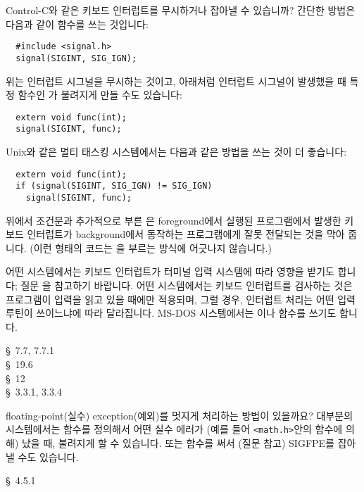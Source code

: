 \begin{faq}
	Control-C와 같은 키보드 인터럽트를 무시하거나 잡아낼 수 있습니까?
\A
	간단한 방법은 다음과 같이  함수를 쓰는 것입니다:
\begin{verbatim}
  #include <signal.h>
  signal(SIGINT, SIG_IGN);
\end{verbatim}

	위는 인터럽트 시그널을 무시하는 것이고, 아래처럼 인터럽트 시그널이
	발생했을 때 특정 함수인 가 불려지게 만들 수도 있습니다:

\begin{verbatim}
  extern void func(int);
  signal(SIGINT, func);
\end{verbatim}

	Unix와 같은 멀티 태스킹 시스템에서는 다음과 같은 방법을 쓰는 것이
	더 좋습니다:

\begin{verbatim}
  extern void func(int);
  if (signal(SIGINT, SIG_IGN) != SIG_IGN)
    signal(SIGINT, func);
\end{verbatim}

	위에서 조건문과 추가적으로 부른 은
	foreground에서 실행된 프로그램에서
	발생한 키보드 인터럽트가 background에서 동작하는 프로그램에게
	잘못 전달되는 것을 막아 줍니다.  (이런 형태의 코드는 을
	부르는 방식에 어긋나지 않습니다.)

	어떤 시스템에서는 키보드 인터럽트가 터미널 입력 시스템에 따라 영향을
	받기도 합니다; 질문 을 참고하기 바랍니다.
	어떤 시스템에서는 키보드 인터럽트를 검사하는 것은 프로그램이
	입력을 읽고 있을 때에만 적용되며, 그럴 경우, 인터럽트 처리는
	어떤 입력 루틴이 쓰이느냐에 따라 달라집니다.
	MS-DOS 시스템에서는 이나  함수를
	쓰기도 합니다.

\R
	\cite{c89} \S\ 7.7, 7.7.1 \\
	\cite{hs} \S\ 19.6  \\
	\cite{pcs} \S\ 12  \\
	\cite{posix} \S\ 3.3.1, 3.3.4
\end{faq}

\begin{faq}
	floating-point(실수) exception(예외)를 멋지게 처리하는 방법이
	있을까요?
\A
	대부분의 시스템에서는  함수를 정의해서 어떤
	실수 에러가 (예를 들어 \verb+<math.h>+안의 함수에 의해) 났을 때,
	불려지게 할 수 있습니다.  또는  함수를 써서
	(질문  참고) SIGFPE를 잡아낼 수도 있습니다.

\R
	\cite{rationale} \S\ 4.5.1
\end{faq}

